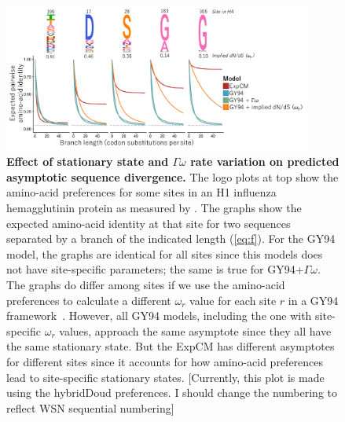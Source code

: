 \documentclass[11pt]{article}
\newcommand\skhcomment[1]{{\color{cyan}[#1]}}
\begin{document}
\begin{figure}
\centerline{\includegraphics[width=0.90\textwidth]{figures/decay.pdf}}
\caption{\label{fig:decay}
\textbf{Effect of stationary state and $\Gamma\omega$ rate variation on predicted asymptotic sequence divergence.}
The logo plots at top show the amino-acid preferences for some sites in an H1 influenza hemagglutinin protein as measured by \citet{doud2016accurate}.
The graphs show the expected amino-acid identity at that site for two sequences separated by a branch of the indicated length (\ref{eq:f}).
For the GY94 model, the graphs are identical for all sites since this models does not have site-specific parameters; the same is true for GY94+$\Gamma\omega$.
The graphs do differ among sites if we use the amino-acid preferences to calculate a different $\omega_r$ value for each site $r$ in a GY94 framework~\citep[\ref{eq:w_r};][]{spielman2015relationship}.
However, all GY94 models, including the one with site-specific $\omega_r$ values, approach the same asymptote since they all have the same stationary state.
But the ExpCM has different asymptotes for different sites since it accounts for how amino-acid preferences lead to site-specific stationary states.
\skhcomment{Currently, this plot is made using the hybridDoud preferences. I should change the numbering to reflect WSN sequential numbering}
}
\end{figure}
\end{document}
